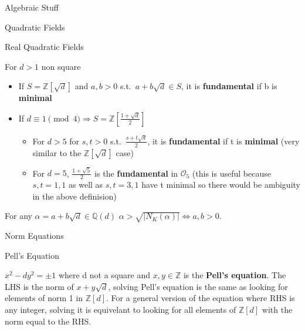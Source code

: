\documentclass[12pt, letterpaper]{article}
\newcommand{\Q}{\mathbb{Q}}
\newcommand{\Z}{\mathbb{Z}}
\newcommand{\Ok}{\mathcal{O}}
\begin{document}
\begin{section}{Algebraic Stuff}
\begin{subsection}{Quadratic Fields}
  \end{subsection}

  \begin{subsection}{Real Quadratic Fields}

    For \(d > 1\) non square
    \begin{itemize}
      \item If \(S = \Z[\sqrt{d}]\) and \(a, b > 0\) s.t.\ \(a + b
            \sqrt{d} \in S\), it is \textbf{fundamental} if b is
            \textbf{minimal}
      \item If \(d \equiv 1 \pmod{4} \Rightarrow S =
            \Z[\frac{1 + \sqrt{d}}{2}]\)
            \begin{itemize}
              \item For \(d > 5\) for \(s, t > 0\) s.t.\ \(\frac{s + t
                    \sqrt{d}}{2}\), it is \textbf{fundamental} if t is
                    \textbf{minimal} (very similar to the
                    \(\Z[\sqrt{d}]\) case)
              \item For \(d = 5\), \(\frac{1 + \sqrt{5}}{2}\) is the
                    \textbf{fundamental} in \(\Ok_{5}\)
                    (this is useful because \(s, t = 1, 1\) as well as
                    \(s, t = 3, 1\) have t minimal so there would be ambiguity
                    in the above definision)
            \end{itemize}
    \end{itemize}

    For any \(\alpha = a + b \sqrt{d} \in \Q(d)\) \(\alpha >
    \sqrt{| N_{K}(\alpha) |} \iff a, b > 0\).

    \end{subsection}

  \begin{subsection}{Norm Equations}

    \begin{subsubsection}{Pell's Equation}

      \(x^{2} - dy^{2} = \pm 1\) where d not a square and \(x, y \in
      \Z\) is the \textbf{Pell's equation}. The LHS is the norm of
      \(x + y \sqrt{d}\), solving Pell's equation is the same as looking for
      elements of norm 1 in \(\Z[d]\). For a general version of the
      equation where RHS is any integer, solving it is equivelant to looking
      for all elements of \(\Z[d]\) with the norm equal to the RHS.


\end{subsubsection}
\end{subsection}
\end{section}
\end{document}
